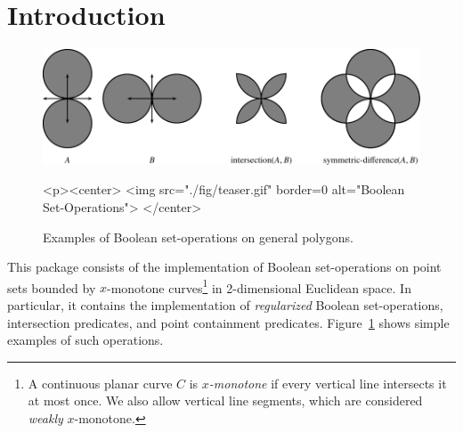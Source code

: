 \lcTex{%
  \newlength{\widthExtra}\setlength{\widthExtra}{1.1cm}
  \newlength{\widthLineReal}\setlength{\widthLineReal}{\linewidth}
  \addtolength{\widthLineReal}{-\widthExtra}
  \newlength{\minipageSpace}\setlength{\minipageSpace}{0.2cm}

  \newlength{\widthLeft}
  \newlength{\widthRight}
}

\newcommand{\reals}{{\rm I\!\hspace{-0.025em} R}}
\newcommand{\calC}{{\cal C}}
\newcommand{\calA}{{\cal A}}
\newcommand{\eps}{{\varepsilon}}
\newcommand{\dcel}{{\sc Dcel}}
\newcommand{\naive}{na\"{\i}ve}
\newcommand{\kdtree}{{\sc Kd}-tree}

\section{Introduction}
\label{bobs_sec:intro}

\begin{figure}[!htp]
\begin{center}
\begin{ccTexOnly}
  \includegraphics{Boolean_set_operations_2/fig/teaser}
\end{ccTexOnly}
\label{fig:teaser}
\begin{ccHtmlOnly}
  <p><center>
    <img src="./fig/teaser.gif" border=0 alt="Boolean Set-Operations">
  </center>
\end{ccHtmlOnly}
\caption{Examples of Boolean set-operations on general polygons.} 
\end{center}
\end{figure}

This package consists of the implementation of Boolean set-operations
on point sets bounded by $x$-monotone curves\footnote{A continuous
planar curve $C$ is {\em $x$-monotone} if every vertical line intersects it at
most once. We also allow vertical line segments, which are considered
{\em weakly} $x$-monotone.} in 2-dimensional Euclidean space. In particular,
it contains the implementation of {\em regularized} Boolean set-operations,
intersection predicates, and point containment predicates.
Figure~\ref{fig:teaser} shows simple examples of such operations.

